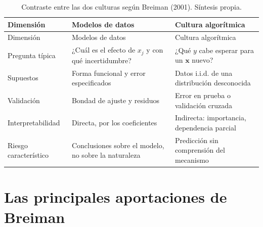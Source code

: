 \documentclass[11pt,a4paper]{article}
\begin{document}
\begingroup\small
\begin{longtable}[]{@{}
  >{\raggedright\arraybackslash}p{}
  >{\raggedright\arraybackslash}p{}
  >{\raggedright\arraybackslash}p{}@{}}
\caption{Contraste entre las dos culturas según Breiman (2001). Síntesis propia.}\label{tbl-culturas}\tabularnewline
\toprule\noalign{}
\begin{minipage}[b]{\linewidth}\raggedright
Dimensión
\end{minipage} & \begin{minipage}[b]{\linewidth}\raggedright
Modelos de datos
\end{minipage} & \begin{minipage}[b]{\linewidth}\raggedright
Cultura algorítmica
\end{minipage} \\
\midrule\noalign{}
\endfirsthead
\toprule\noalign{}
\begin{minipage}[b]{\linewidth}\raggedright
Dimensión
\end{minipage} & \begin{minipage}[b]{\linewidth}\raggedright
Modelos de datos
\end{minipage} & \begin{minipage}[b]{\linewidth}\raggedright
Cultura algorítmica
\end{minipage} \\
\midrule\noalign{}
\endhead
\bottomrule\noalign{}
\endlastfoot
Pregunta típica & ¿Cuál es el efecto de \(x_j\) y con qué incertidumbre? & ¿Qué \(y\) cabe esperar para un \(\mathbf{x}\) nuevo? \\
Supuestos & Forma funcional y error especificados & Datos i.i.d. de una distribución desconocida \\
Validación & Bondad de ajuste y residuos & Error en prueba o validación cruzada \\
Interpretabilidad & Directa, por los coeficientes & Indirecta: importancia, dependencia parcial \\
Riesgo característico & Conclusiones sobre el modelo, no sobre la naturaleza & Predicción sin comprensión del mecanismo \\
\end{longtable}
\endgroup

\section{Las principales aportaciones de Breiman}\label{sec-aportes}
\end{document}
